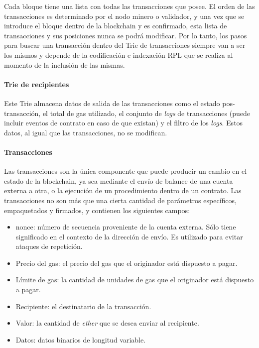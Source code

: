 Cada bloque tiene una lista con todas las transacciones que posee. El orden de las transacciones es determinado por el nodo minero o validador, y una vez que se introduce el bloque dentro de la blockchain y es confirmado, esta lista de transacciones y sus posiciones nunca se podrá modificar. Por lo tanto, los pasos para buscar una transacción dentro del Trie de transacciones siempre van a ser los mismos y depende de la codificación e indexación RPL que se realiza al momento de la inclusión de las mismas.

\paragraph{Trie de recipientes}

Este Trie almacena datos de salida de las transacciones como el estado pos-transacción, el total de gas utilizado, el conjunto de \textit{logs} de transacciones (puede incluir eventos de contrato en caso de que existan) y el filtro de los \textit{logs}. Estos datos, al igual que las transacciones, no se modifican.

\paragraph{Transacciones}
\label{bc_ethereum_tx}

Las transacciones son la única componente que puede producir un cambio en el estado de la blockchain, ya sea mediante el envío de balance de una cuenta externa a otra, o la ejecución de un procedimiento dentro de un contrato. Las transacciones no son más que una cierta cantidad de parámetros específicos, empaquetados y firmados, y contienen los siguientes campos:

\begin{itemize}
  \item nonce: número de secuencia proveniente de la cuenta externa. Sólo tiene significado en el contexto de la dirección de envío. Es utilizado para evitar ataques de repetición.
  \item Precio del gas: el precio del gas que el originador está dispuesto a pagar.
  \item Límite de gas: la cantidad de unidades de gas que el originador está dispuesto a pagar.
  \item Recipiente: el destinatario de la transacción.
  \item Valor: la cantidad de \textit{ether} que se desea enviar al recipiente.
  \item Datos: datos binarios de longitud variable.
\end{itemize}

